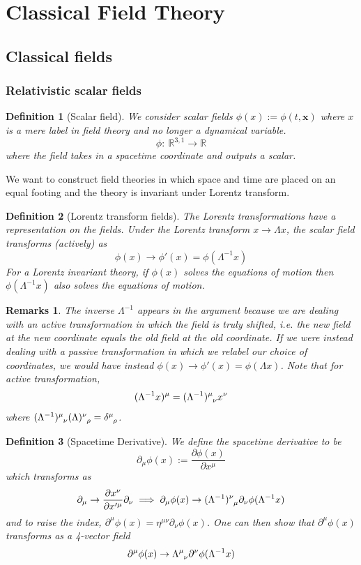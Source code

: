 \documentclass[a4paper]{article}
\newtheorem{remarks}{Remarks}[section]
\theoremstyle{new}
\newtheorem{defi}{Definition}[section]
\begin{document}
\section{Classical Field Theory}
\subsection{Classical fields}
\subsubsection{Relativistic scalar fields}
\begin{defi}[Scalar field]
We consider scalar fields $\phi(x):=\phi(t,\mathbf{x})$ where $x$ is a mere label in field theory and no longer a dynamical variable. 
$$\phi:~\mathbb{R}^{3,1}\rightarrow\mathbb{R}$$
where the field takes in a spacetime coordinate and outputs a scalar.
\end{defi}
We want to construct field theories in which space and time are placed on an equal footing and the theory is invariant under Lorentz transform.
\begin{defi}[Lorentz transform fields]
The Lorentz transformations have a representation on the fields. Under the Lorentz transform $x\rightarrow\Lambda x$, the scalar field transforms (actively) as
$$\phi(x)\rightarrow\phi'(x)=\phi(\Lambda^{-1}x)$$
For a Lorentz invariant theory, if $\phi(x)$ solves the equations of motion then $\phi(\Lambda^{-1}x)$ also solves the equations of motion. 
\end{defi}
\begin{remarks}
The inverse $\Lambda^{-1}$ appears in the argument because we are dealing with an active transformation in which the field is truly shifted, i.e. the new field at the new coordinate equals the old field at the old coordinate. If we were instead dealing with a passive transformation in which we relabel our choice of coordinates, we would have instead $\phi(x)\rightarrow\phi'(x)=\phi(\Lambda x)$. Note that for active transformation,
$$(\Lambda^{-1}x)^\mu=\tensor*{(\Lambda^{-1})}{*_{}^{\mu}_{\nu}}x^\nu$$
where $\tensor*{(\Lambda^{-1})}{*_{}^{\mu}_{\nu}}\tensor*{(\Lambda)}{*_{}^{\nu}_{\rho}}=\tensor*{\delta}{*_{}^{\mu}_{\rho}}$.
\end{remarks}
\begin{defi}[Spacetime Derivative]
We define the spacetime derivative to be
$$\partial_\mu\phi(x):=\frac{\partial\phi(x)}{\partial x^\mu}$$
which transforms as
$$\partial_\mu\rightarrow\frac{\partial x^\nu}{\partial x'^\mu}\partial_\nu\implies\partial_\mu\phi(x)\rightarrow\tensor*{(\Lambda^{-1})}{*_{}^{\nu}_{\mu}}\partial_\nu\phi(\Lambda^{-1}x)$$
and to raise the index, $\partial^\mu\phi(x)=\eta^{\mu\nu}\partial_\nu\phi(x)$. One can then show that $\partial^\mu\phi(x)$ transforms as a 4-vector field
$$\partial^\mu\phi(x)\rightarrow\tensor*{\Lambda}{*_{}^{\mu}_{\nu}}\partial^\nu\phi(\Lambda^{-1}x)$$
\end{defi}
\end{document}
